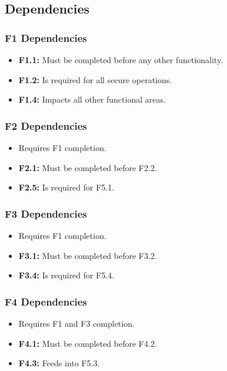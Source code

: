 \subsection{Dependencies}
\label{subsec:dependencies}%

\subsubsection{F1 Dependencies}
\begin{itemize}
    \item \textbf{F1.1:} Must be completed before any other functionality.
    \item \textbf{F1.2:} Is required for all secure operations.
    \item \textbf{F1.4:} Impacts all other functional areas.
\end{itemize}

\subsubsection{F2 Dependencies}
\begin{itemize}
    \item Requires F1 completion.
    \item \textbf{F2.1:} Must be completed before F2.2.
    \item \textbf{F2.5:} Is required for F5.1.
\end{itemize}

\subsubsection{F3 Dependencies}
\begin{itemize}
    \item Requires F1 completion.
    \item \textbf{F3.1:} Must be completed before F3.2.
    \item \textbf{F3.4:} Is required for F5.4.
\end{itemize}

\subsubsection{F4 Dependencies}
\begin{itemize}
    \item Requires F1 and F3 completion.
    \item \textbf{F4.1:} Must be completed before F4.2.
    \item \textbf{F4.3:} Feeds into F5.3.
\end{itemize}


